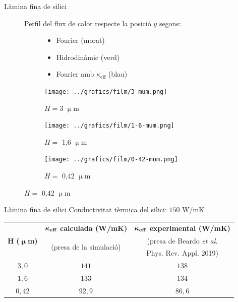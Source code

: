 \documentclass{beamer}
\begin{document}
\begin{frame}{L\`{a}mina fina de silici}
\begin{figure}
\begin{center}
\vspace{-4mm}
Perfil del flux de calor respecte la posici\'{o} $y$ segons:
\begin{subfigure}{0.49\textwidth}
\begin{itemize}
\item Fourier (morat)
\item Hidrodin\`{a}mic (verd)
\item Fourier amb $\kappa_{\text{eff}}$ (blau)
\end{itemize}
\end{subfigure}
\begin{subfigure}{0.49\textwidth}
\caption*{$H=3$ $\upmu$m}
\vspace{-2mm}
\texttt{[image: ../grafics/film/3-mum.png]}
\end{subfigure}
\begin{subfigure}{0.49\textwidth}
\caption*{$H=$ 1,6 $\upmu$m}
\vspace{-2mm}
\texttt{[image: ../grafics/film/1-6-mum.png]}
\end{subfigure}
\begin{subfigure}{0.49\textwidth}
\caption*{$H=$ 0,42 $\upmu$m}
\vspace{-2mm}
\texttt{[image: ../grafics/film/0-42-mum.png]}
\end{subfigure}
\end{center}
\end{figure}
\end{frame}

\begin{frame}{L\`{a}mina fina de silici}
Conductivitat t\`{e}rmica del silici: $150$ W/mK
\begin{table}[ht!]
\centering
\label{Tab:keff}
\begin{tabular}{c|c|c}
\multirow{3}{*}{$\boldsymbol H$ \textbf{(}$\boldsymbol\upmu$\textbf{m)}}&$\boldsymbol\kappa_{\text{\textbf{eff}}}$ \textbf{calculada (W/mK)}&$\boldsymbol\kappa_{\text{\textbf{eff}}}$ \textbf{experimental (W/mK)}\vspace{-0.7mm}\\
&\multirow{2}{*}{\footnotesize{(presa de la simulaci\'{o})}}&\footnotesize{(presa de Beardo \emph{et al.}}\vspace{-0.7mm}\\
&&\footnotesize{Phys. Rev. Appl. 2019)}\\\hline
$3,0$&$141$&$138$\\
\pause
$1,6$&133&134\\
\pause
$0,42$&$92,9$&$86,6$
\end{tabular}
\end{table}
\end{frame}
\end{document}
